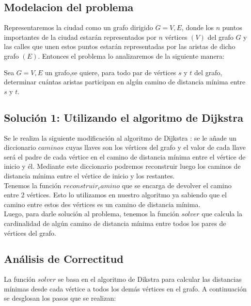 \documentclass[
10pt, %
a4paper, %
oneside, %
headinclude,footinclude, %
BCOR5mm, %
]{scrartcl}
\begin{document}
\subsection{Modelacion del problema}

Representaremos la ciudad como un grafo dirigido $G = {V,E}$, donde los $n$ puntos importantes
de la ciudad estarán representados por $n$ vértices $(V)$ del grafo $G$ y las calles que unen estos 
puntos estarán representadas por las aristas de dicho grafo $(E)$. Entonces el problema lo analizaremos
de la siguiente manera:

Sea $G = {V,E}$ un grafo,se quiere, para todo par de vértices $s$ y $t$ del grafo, determinar cuántas aristas 
participan en algún camino de distancia mínima entre $s$ y $t$.


\subsection{Solución 1: Utilizando el algoritmo de Dijkstra}

Se le realiza la siguiente modificación al algoritmo de Dijkstra : se le 
añade un diccionario $caminos$ cuyas llaves son los vértices del grafo 
y el valor de cada llave será el padre de cada vértice en el camino de distancia 
mínima entre el vértice de inicio y él. Mediante este diccionario podremos reconstruir 
luego los caminos de distancia mínima entre el vértice de inicio y los restantes. \\

Tenemos la función $reconstruir_camino$ que se encarga de devolver el camino entre 2 vértices. Esto 
lo utilizamos en nuestro algoritmo ya sabiendo que el camino entre estos des vértices es un camino de 
distancia mínima.\\

Luego, para darle solución al problema, tenemos la función $solver$ que calcula la cardinalidad de algún 
camino de distancia mínima entre todos los pares de vértices del grafo.

\subsection{Análisis de Correctitud}

La función $solver$ se basa en el algoritmo de Dikstra para calcular las distancias mínimas desde 
cada vértice a todos los demás vértices en el grafo. A continuación se desglosan los pasos que se realizan:\\
\end{document}
